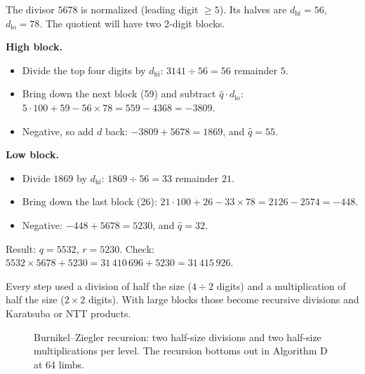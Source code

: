 \begin{example}
The divisor $5678$ is normalized (leading digit $\ge 5$). Its halves are
$d_{\text{hi}} = 56$, $d_{\text{lo}} = 78$. The quotient will have two 2-digit blocks.

\textbf{High block.}
\begin{itemize}
  \item Divide the top four digits by $d_{\text{hi}}$: $3141 \div 56 = 56$ remainder $5$.
  \item Bring down the next block (59) and subtract $\hat q \cdot d_{\text{lo}}$:
        $5 \cdot 100 + 59 - 56 \times 78 = 559 - 4368 = -3809$.
  \item Negative, so add $d$ back: $-3809 + 5678 = 1869$, and $\hat q = 55$.
\end{itemize}

\textbf{Low block.}
\begin{itemize}
  \item Divide $1869$ by $d_{\text{hi}}$: $1869 \div 56 = 33$ remainder $21$.
  \item Bring down the last block (26): $21 \cdot 100 + 26 - 33 \times 78 = 2126 - 2574 = -448$.
  \item Negative: $-448 + 5678 = 5230$, and $\hat q = 32$.
\end{itemize}

Result: $q = 5532$, $r = 5230$. Check: $5532 \times 5678 + 5230 = 31\,410\,696 + 5230 = 31\,415\,926$.

Every step used a division of half the size ($4 \div 2$ digits) and a multiplication of half
the size ($2 \times 2$ digits). With large blocks those become recursive divisions and
Karatsuba or NTT products.
\end{example}

\begin{figure}[ht]
\centering
{}
\caption{Burnikel--Ziegler recursion: two half-size divisions and two half-size
multiplications per level. The recursion bottoms out in Algorithm D at 64 limbs.}
\end{figure}

